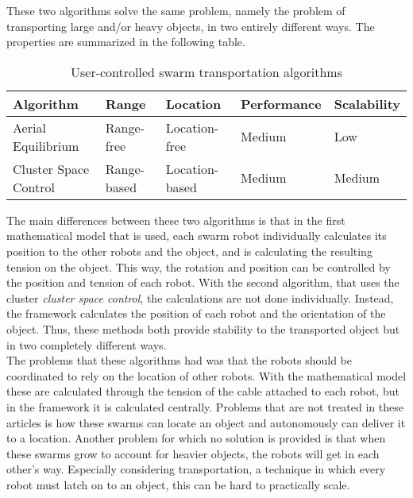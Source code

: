 These two algorithms solve the same problem, namely the problem of transporting large and/or heavy objects, in two entirely different ways. 
The properties are summarized in the following table. 


  \begin{table}[H]
  \renewcommand{\arraystretch}{1.3}
  \caption{User-controlled swarm transportation algorithms}
  \label{table_alg_coltrans1}
  \centering
  \begin{tabular}{|p{3cm}|l|l|l|l|}
    \hline
    \bfseries Algorithm & \bfseries Range &\bfseries Location &  \bfseries Performance & \bfseries Scalability\\
    \hline
     Aerial Equilibrium & Range-free & Location-free & Medium & Low\\\hline
     Cluster Space Control & Range-based & Location-based & Medium & Medium\\\hline

    \end{tabular}
  \end{table}

The main differences between these two algorithms is that in the first mathematical model that is used, each swarm robot individually calculates its position to the other robots and the object, and is calculating the resulting tension on the object. 
This way, the rotation and position can be controlled by the position and tension of each robot. 
With the second algorithm, that uses the cluster \emph{cluster space control}, the calculations are not done individually. 
Instead, the framework calculates the position of each robot and the orientation of the object. 
Thus, these methods both provide stability to the transported object but in two completely different ways. \\

The problems that these algorithms had was that the robots should be coordinated to rely on the location of other robots.
With the mathematical model these are calculated through the tension of the cable attached to each robot, but in the framework it is calculated centrally. 
Problems that are not treated in these articles is how these swarms can locate an object and autonomously can deliver it to a location. 
Another problem for which no solution is provided is that when these swarms grow to account for heavier objects, the robots will get in each other's way. 
Especially considering transportation, a technique in which every robot must latch on to an object, this can be hard to practically scale. 

